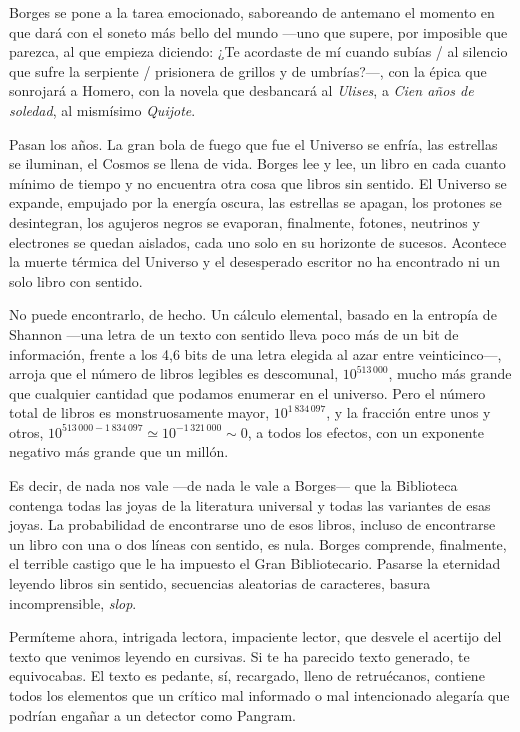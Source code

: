 \documentclass[11pt,a4paper]{article}
\begin{document}
Borges se pone a la tarea emocionado, saboreando de antemano el momento en que dará con el soneto más bello del mundo ---uno que supere, por imposible que parezca, al que empieza diciendo: ¿Te acordaste de mí cuando subías / al silencio que sufre la serpiente / prisionera de grillos y de umbrías?---, con la épica que sonrojará a Homero, con la novela que desbancará al \emph{Ulises}, a \emph{Cien años de soledad}, al mismísimo \emph{Quijote}.

Pasan los años. La gran bola de fuego que fue el Universo se enfría, las estrellas se iluminan, el Cosmos se llena de vida. Borges lee y lee, un libro en cada cuanto mínimo de tiempo y no encuentra otra cosa que libros sin sentido. El Universo se expande, empujado por la energía oscura, las estrellas se apagan, los protones se desintegran, los agujeros negros se evaporan, finalmente, fotones, neutrinos y electrones se quedan aislados, cada uno solo en su horizonte de sucesos. Acontece la muerte térmica del Universo y el desesperado escritor no ha encontrado ni un solo libro con sentido.

No puede encontrarlo, de hecho. Un cálculo elemental, basado en la entropía de Shannon ---una letra de un texto con sentido lleva poco más de un bit de información, frente a los 4,6 bits de una letra elegida al azar entre veinticinco---, arroja que el número de libros legibles es descomunal, $10^{513\,000}$, mucho más grande que cualquier cantidad que podamos enumerar en el universo. Pero el número total de libros es monstruosamente mayor, $10^{1\,834\,097}$, y la fracción entre unos y otros, $10^{513\,000 - 1\,834\,097} \simeq 10^{-1\,321\,000} \sim 0$, a todos los efectos, con un exponente negativo más grande que un millón.

Es decir, de nada nos vale ---de nada le vale a Borges--- que la Biblioteca contenga todas las joyas de la literatura universal y todas las variantes de esas joyas. La probabilidad de encontrarse uno de esos libros, incluso de encontrarse un libro con una o dos líneas con sentido, es nula. Borges comprende, finalmente, el terrible castigo que le ha impuesto el Gran Bibliotecario. Pasarse la eternidad leyendo libros sin sentido, secuencias aleatorias de caracteres, basura incomprensible, \emph{slop}.

Permíteme ahora, intrigada lectora, impaciente lector, que desvele el acertijo del texto que venimos leyendo en cursivas. Si te ha parecido texto generado, te equivocabas. El texto es pedante, sí, recargado, lleno de retruécanos, contiene todos los elementos que un crítico mal informado o mal intencionado alegaría que podrían engañar a un detector como Pangram.
\end{document}
